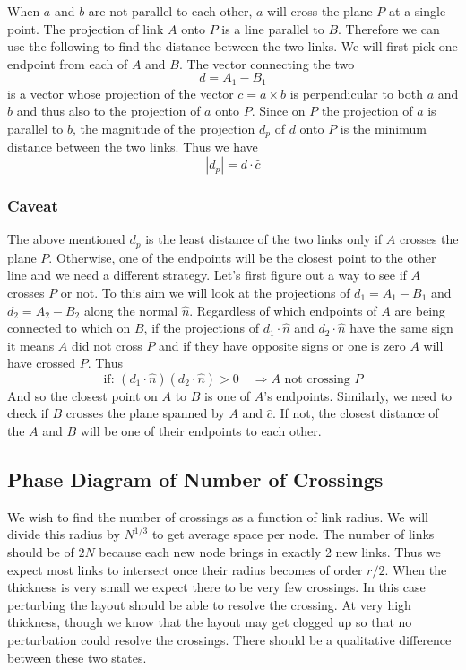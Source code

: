 \documentclass[nofootinbib,preprint,floatfix,titlepage,superscriptaddress]{revtex4} %
\begin{document}
When $ a$ and $b$ are not parallel to each other, $a$ will cross the plane $P$ at a single point. The projection of link $A$ onto $P$ is a line parallel to $B$. Therefore we can use the following to find the distance between the two links. We will first pick one endpoint from each of $A$ and $B$. The vector connecting the two
\[d = A_1-B_1\]
is a vector whose projection of the vector $c = a\times b$ is perpendicular to both $a$ and $b$ and thus also to the projection of $a$ onto $P$. Since on $P$ the projection of $a$ is parallel to $b$, the magnitude of the projection $d_p$ of $d$ onto $P$ is the minimum distance between the two links. Thus we have
\[|d_p| = d \cdot \hat{c}\]

\subsubsection{Caveat}
The above mentioned $d_p$ is the least distance of the two links only if $A$ crosses the plane $P$. Otherwise, one of the endpoints will be the closest point to the other line and we need a different strategy. Let's first figure out a way to see if $A$ crosses $P$ or not. To this aim we will look at the projections of $d_1= A_1-B_1$ and $d_2 = A_2 - B_2$ along the normal $\hat{n} $. Regardless of which endpoints of $A$ are being connected to which on $B$, if the projections of $d_1\cdot \hat{n}$ and $d_2\cdot \hat{n} $ have the same sign it means $A$ did not cross $P$ and if they have opposite signs or one is zero $A$ will have crossed $P$. Thus  
\[\mbox{if: } (d_1\cdot \hat{n})(d_2\cdot \hat{n}) >0 \quad \Rightarrow  A\mbox{ not crossing }P\]
And so the closest point on $A$ to $B$ is one of $A$'s endpoints. Similarly, we need to check if $B$ crosses the plane spanned by $A$ and $\hat{c}$. If not, the closest distance of the $A$ and $B$ will be one of their endpoints to each other. 

\subsection{Phase Diagram of Number of Crossings} 
We wish to find the number of crossings as a function of link radius. 
We will divide this radius by $N^{1/3}$ to get average space per node. 
The number of links should be of $2N$ because each new node brings in exactly 2 new links. Thus we expect most links to intersect once their radius becomes of order $r/2 $. 
When the thickness is very small we expect there to be very few crossings. In this case perturbing the layout should be able to resolve the crossing. At very high thickness, though we know that the layout may get clogged up so that no perturbation could resolve the crossings. There should be a qualitative difference between these two states.  
\end{document}
